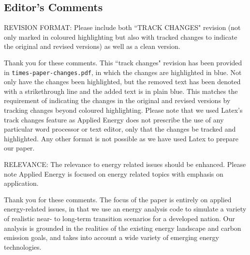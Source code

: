 \documentclass[answers,11pt]{exam}
\begin{document}
\begin{questions}

        \section*{Editor's Comments}

        
         \question REVISION FORMAT: Please include both ``TRACK CHANGES" revision (not only marked in coloured highlighting but also with tracked changes to indicate the original and revised versions) as well as a clean version.
        
        \begin{solution}
                Thank you for these comments. This ``track changes" revision has been provided in \texttt{times-paper-changes.pdf}, in which the changes are highlighted in blue. Not only have the changes been highlighted, but the removed text has been denoted with a strikethrough line and the added text is in plain blue. This matches the requirement of indicating the changes in the original and revised versions by tracking changes beyond coloured highlighting. Please note that we used Latex's track changes feature as Applied Energy does not prescribe the use of any particular word processor or text editor, only that the changes be tracked and highlighted. Any other format is not possible as we have used Latex to prepare our paper.
                
        \end{solution}

        
         \question RELEVANCE: The relevance to energy related issues should be enhanced. Please note Applied Energy is focused on energy related topics with emphasis on application.
        
        \begin{solution}
                Thank you for these comments. The focus of the paper is entirely on applied energy-related issues, in that we use an energy analysis code to simulate a variety of realistic near- to long-term transition scenarios for a developed nation. Our analysis is grounded in the realities of the existing energy landscape and carbon emission goals, and takes into account a wide variety of emerging energy technologies.
                

\end{solution}
\end{questions}
\end{document}
